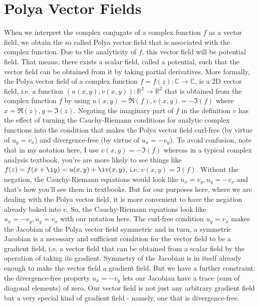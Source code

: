 \documentclass[12pt]{article}
\begin{document}
\section{Polya Vector Fields}
When we interpret the complex conjugate of a complex function $f$ as a vector field, we obtain the so called Polya vector field that is associated with the complex function. Due to the analyticity of $f$, this vector field will be potential field. That means, there exists a scalar field, called a potential, such that the vector field can be obtained from it by taking partial derivatives. More formally, the Polya vector field of a complex function $f = f(z): \mathbb{C} \rightarrow \mathbb{C}$, is a 2D vector field, i.e. a function $(u(x,y), v(x,y)): \mathbb{R}^2 \rightarrow \mathbb{R}^2$ that is obtained from the complex function $f$ by using $u(x,y) = \Re(f), v(x,y) = -\Im(f)$ where $x = \Re(z), y = \Im(z)$. Negating the imaginary part of $f$ in the definition $v$ has the effect of turning the Cauchy-Riemann conditions for analytic complex functions into the condition that makes the Polya vector field curl-free (by virtue of $u_y = v_x$) and divergence-free (by virtue of $u_x = - v_y$). To avoid confusion, note that in my notation here, I use $v(x,y) = -\Im(f)$ whereas in a typical complex analysis textbook, you're are more likely to see things like $f(z) = f(x + \i y) = u(x,y) + \i v(x,y)$, i.e. $v(x,y) = \Im(f)$. Without the negation, the Cauchy-Riemann equations would look like $u_x = v_y, u_y = -v_x$ and that's how you'll see them in textbooks. But for our purposes here, where we are dealing with the Polya vector field, it is more convenient to have the negation already baked into $v$. So, the Cauchy-Riemann equations look like $u_x = -v_y, u_y = v_x$ with our notation here. The curl-free condition $u_y = v_x$ makes the Jacobian of the Polya vector field symmetric and in turn, a symmetric Jacobian is a necessary and sufficient condition for the vector field to be a gradient field, i.e. a vector field that can be obtained from a scalar field by the operation of taking its gradient. Symmetry of the Jacobian is in itself already enough to make the vector field a gradient field. But we have a further constraint: the divergence-free property $u_x = -v_y$ lets our Jacobian have a trace (sum of diagonal elements) of zero. Our vector field is not just any arbitrary gradient field but a very special kind of gradient field - namely, one that is divergence-free. 
\end{document}
